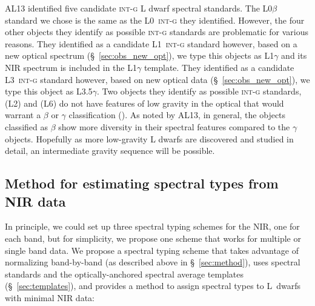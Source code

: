 \documentclass[12pt,preprint]{aastex}
\begin{document}
AL13 identified five candidate \textsc{int-g} L dwarf spectral standards.
The L0$\beta$ standard we chose is the same as the L0~\textsc{int-g} they identified.
However, the four other objects they identify as possible \textsc{int-g} standards are problematic for various reasons.
They identified  as a candidate L1~\textsc{int-g} standard however, based on a new optical spectrum (\S~\ref{sec:obs_new_opt}), we type this objects as L1$\gamma$ and its NIR spectrum is included in the L1$\gamma$ template.
They identified  as a candidate L3~\textsc{int-g} standard however, based on new optical data (\S~\ref{sec:obs_new_opt}), we type this object as L3.5$\gamma$.
Two objects they identify as possible \textsc{int-g} standards,  (L2) and  (L6) do not have features of low gravity in the optical that would warrant a $\beta$ or $\gamma$ classification (\cite{Cruz07,K00}).
As noted by AL13, in general, the objects classified as $\beta$ show more diversity in their spectral features compared to the $\gamma$ objects. Hopefully as more low-gravity L dwarfs are discovered and studied in detail, an intermediate gravity sequence will be possible.

\subsection{Method for estimating spectral types from NIR data}

In principle, we could set up three spectral typing schemes for the NIR, one for each band, but for simplicity, we propose one scheme that works for multiple or single band data.
We propose a spectral typing scheme that takes advantage of normalizing band-by-band (as described above in \S~\ref{sec:method}), uses spectral standards and the optically-anchored spectral average templates (\S~\ref{sec:templates}), and provides a method to assign spectral types to L~dwarfs with minimal NIR data:
\end{document}
